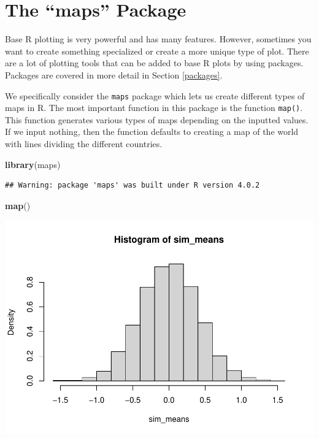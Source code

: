 \documentclass[
]{book}
\newenvironment{Shaded}{\begin{snugshade}}{\end{snugshade}}
\newcommand{\KeywordTok}[1]{\textcolor[rgb]{0.13,0.29,0.53}{\textbf{#1}}}
\newcommand{\NormalTok}[1]{#1}
\begin{document}
\hypertarget{the-maps-package}{%
\section{The ``maps'' Package}\label{the-maps-package}}

Base R plotting is very powerful and has many features. However, sometimes you want to create something specialized or create a more unique type of plot. There are a lot of plotting tools that can be added to base R plots by using packages. Packages are covered in more detail in Section \ref{packages}.

We specifically consider the \texttt{maps} package which lets us create different types of maps in R. The most important function in this package is the function \texttt{map()}. This function generates various types of maps depending on the inputted values. If we input nothing, then the function defaults to creating a map of the world with lines dividing the different countries.

\begin{Shaded}
\begin{Highlighting}[]
\KeywordTok{library}\NormalTok{(maps)}
\end{Highlighting}
\end{Shaded}

\begin{verbatim}
## Warning: package 'maps' was built under R version 4.0.2
\end{verbatim}

\begin{Shaded}
\begin{Highlighting}[]
\KeywordTok{map}\NormalTok{()}
\end{Highlighting}
\end{Shaded}

\includegraphics{_main_files/figure-latex/unnamed-chunk-255-1.pdf}
\end{document}

